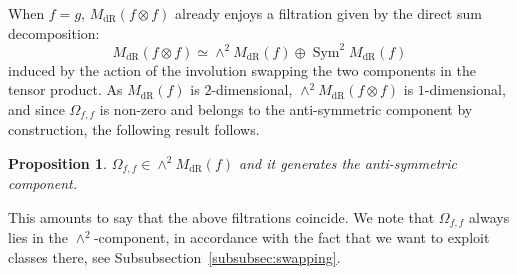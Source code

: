 \documentclass[10pt,a4paper]{amsart}
\DeclareMathOperator{\Sym}{Sym}
\DeclareMathOperator{\dR}{dR}
\newtheorem{proposition}{Proposition}
\begin{document}
When $f=g$, $M_{\dR}(f\otimes f)$ already enjoys a filtration given by the direct sum decomposition:
\[
    M_{\dR}(f\otimes f) \simeq \wedge^2 M_{\dR}(f) \oplus \Sym^2 M_{\dR}(f)
\]
induced by the action of the involution swapping the two components in the tensor product. As $M_{\dR}(f)$ is $2$-dimensional, $\wedge^2 M_{\dR}(f\otimes f)$ is $1$-dimensional, and since $\Omega_{f,f}$ is non-zero and belongs to the anti-symmetric component by construction, the following result follows.
\begin{proposition}
    $\Omega_{f,f} \in \wedge^2 M_{\dR}(f)$ and it generates the anti-symmetric component.
\end{proposition}
This amounts to say that the above filtrations coincide. We note that $\Omega_{f,f}$ always lies in the $\wedge^2$-component, in accordance with the fact that we want to exploit classes there, see Subsubsection~\ref{subsubsec:swapping}.
\end{document}
